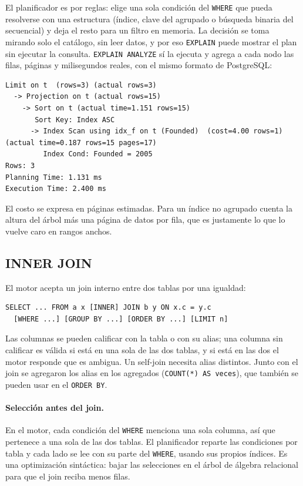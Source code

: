 \documentclass[11pt,a4paper]{article}
\begin{document}
El planificador es por reglas: elige una sola condición del \texttt{WHERE} que pueda resolverse con una estructura (índice, clave del agrupado o búsqueda binaria del secuencial) y deja el resto para un filtro en memoria. La decisión se toma mirando solo el catálogo, sin leer datos, y por eso \texttt{EXPLAIN} puede mostrar el plan sin ejecutar la consulta. \texttt{EXPLAIN ANALYZE} sí la ejecuta y agrega a cada nodo las filas, páginas y milisegundos reales, con el mismo formato de PostgreSQL:

\begin{lstlisting}
Limit on t  (rows=3) (actual rows=3)
  -> Projection on t (actual rows=15)
    -> Sort on t (actual time=1.151 rows=15)
       Sort Key: Index ASC
      -> Index Scan using idx_f on t (Founded)  (cost=4.00 rows=1) (actual time=0.187 rows=15 pages=17)
         Index Cond: Founded = 2005
Rows: 3
Planning Time: 1.131 ms
Execution Time: 2.400 ms
\end{lstlisting}

El costo se expresa en páginas estimadas. Para un índice no agrupado cuenta la altura del árbol más una página de datos por fila, que es justamente lo que lo vuelve caro en rangos anchos.

\subsection{INNER JOIN}
\label{sec:join}

El motor acepta un join interno entre dos tablas por una igualdad:

\begin{lstlisting}
SELECT ... FROM a x [INNER] JOIN b y ON x.c = y.c
  [WHERE ...] [GROUP BY ...] [ORDER BY ...] [LIMIT n]
\end{lstlisting}

Las columnas se pueden calificar con la tabla o con su alias; una columna sin calificar es válida si está en una sola de las dos tablas, y si está en las dos el motor responde que es ambigua. Un self-join necesita alias distintos. Junto con el join se agregaron los alias en los agregados (\texttt{COUNT(*) AS veces}), que también se pueden usar en el \texttt{ORDER BY}.

\paragraph{Selección antes del join.} En el motor, cada condición del \texttt{WHERE} menciona una sola columna, así que pertenece a una sola de las dos tablas. El planificador reparte las condiciones por tabla y cada lado se lee con su parte del \texttt{WHERE}, usando sus propios índices. Es una optimización sintáctica: bajar las selecciones en el árbol de álgebra relacional para que el join reciba menos filas.
\end{document}
